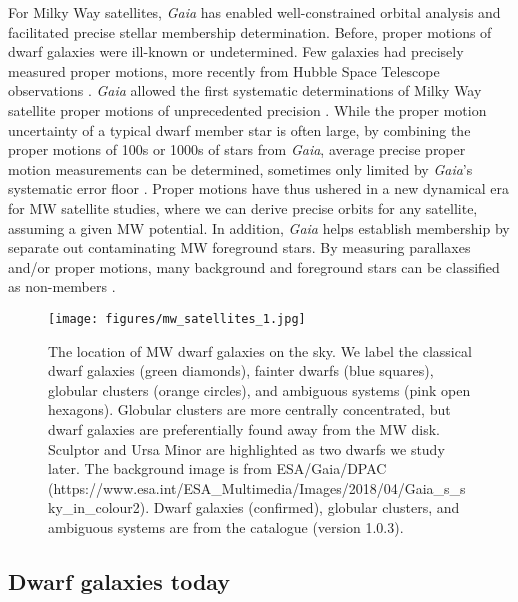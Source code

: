For Milky Way satellites, \emph{Gaia} has enabled well-constrained
orbital analysis and facilitated precise stellar membership
determination. Before, proper motions of dwarf galaxies were ill-known
or undetermined. Few galaxies had precisely measured proper motions,
more recently from Hubble Space Telescope observations
\citep[e.g.,][]{sohn+2017}. \emph{Gaia} allowed the first systematic
determinations of Milky Way satellite proper motions of unprecedented
precision \citep{pace+li2019, MV2020a}. While the proper motion
uncertainty of a typical dwarf member star is often large, by combining
the proper motions of 100s or 1000s of stars from \emph{Gaia}, average
precise proper motion measurements can be determined, sometimes only
limited by \emph{Gaia}'s systematic error floor
\citep[e.g.,][]{MV2020a}. Proper motions have thus ushered in a new
dynamical era for MW satellite studies, where we can derive precise
orbits for any satellite, assuming a given MW potential. In addition,
\emph{Gaia} helps establish membership by separate out contaminating MW
foreground stars. By measuring parallaxes and/or proper motions, many
background and foreground stars can be classified as non-members
\citep[e.g.,][\citet{jensen+2024}]{battaglia+2022}.

\begin{figure}
\centering
\texttt{[image: figures/mw\_satellites\_1.jpg]}
\caption[Dwarf galaxies sky position]{The location of MW dwarf galaxies
on the sky. We label the classical dwarf galaxies (green diamonds),
fainter dwarfs (blue squares), globular clusters (orange circles), and
ambiguous systems (pink open hexagons). Globular clusters are more
centrally concentrated, but dwarf galaxies are preferentially found away
from the MW disk. Sculptor and Ursa Minor are highlighted as two dwarfs
we study later. The background image is from ESA/Gaia/DPAC
(https://www.esa.int/ESA\_Multimedia/Images/2018/04/Gaia\_s\_sky\_in\_colour2).
Dwarf galaxies (confirmed), globular clusters, and ambiguous systems are
from the \citet{pace2024} catalogue (version
1.0.3).}\label{fig:mw_satellite_system}
\end{figure}

\subsection{Dwarf galaxies today}\label{dwarf-galaxies-today}

